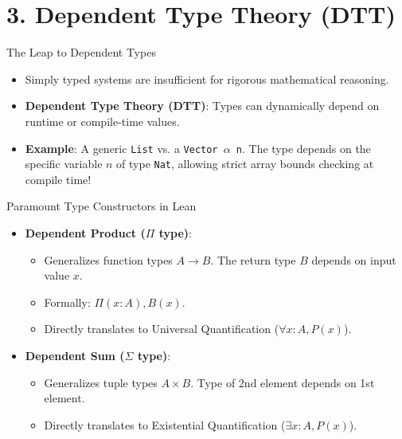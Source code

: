 \documentclass[12pt, aspectratio=169]{beamer}
\begin{document}
\section{3. Dependent Type Theory (DTT)}

\begin{frame}{The Leap to Dependent Types}
\begin{itemize}\setlength{\itemsep}{1.2em}
  \item Simply typed systems are insufficient for rigorous mathematical reasoning.
  \item \textbf{Dependent Type Theory (DTT)}: Types can dynamically depend on runtime or compile-time values.
  \item \textbf{Example}: A generic \texttt{List} vs. a \texttt{Vector $\alpha$ n}. The type depends on the specific variable $n$ of type \texttt{Nat}, allowing strict array bounds checking at compile time!
\end{itemize}
\end{frame}

\begin{frame}{Paramount Type Constructors in Lean}
\begin{itemize}\setlength{\itemsep}{1.2em}
  \item \textbf{Dependent Product ($\Pi$ type)}:
  \begin{itemize}
      \item Generalizes function types $A \to B$. The return type $B$ depends on input value $x$.
      \item Formally: $\Pi (x : A), B(x)$.
      \item Directly translates to Universal Quantification ($\forall x : A, P(x)$).
  \end{itemize}
  \item \textbf{Dependent Sum ($\Sigma$ type)}:
  \begin{itemize}
      \item Generalizes tuple types $A \times B$. Type of 2nd element depends on 1st element.
      \item Directly translates to Existential Quantification ($\exists x : A, P(x)$).
  \end{itemize}
\end{itemize}
\end{frame}
\end{document}
